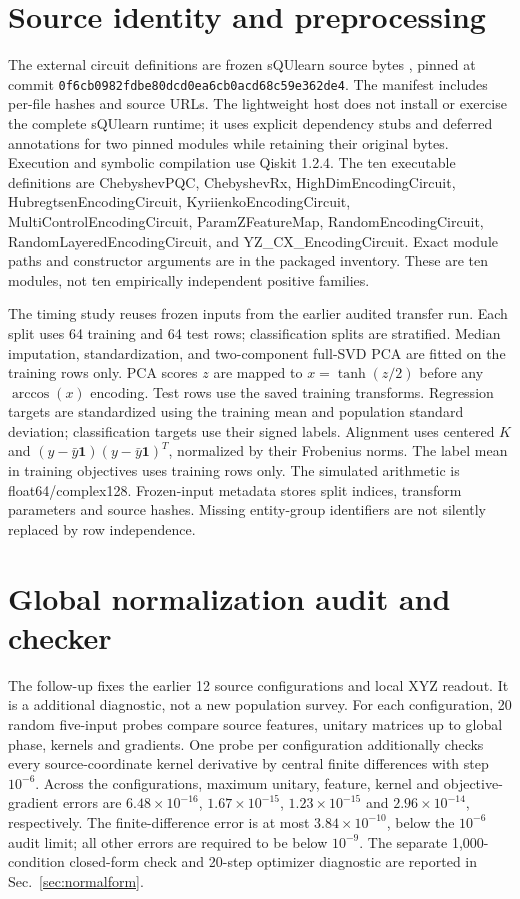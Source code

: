 \section{Source identity and preprocessing}
\label{app:source}
{\raggedright
The external circuit definitions are frozen sQUlearn source bytes
\cite{squlearn}, pinned at commit
\texttt{0f6cb0982fdbe80dcd0ea6cb0acd68c59e362de4}.
The manifest includes per-file hashes and source URLs. The lightweight
host does not install or exercise the complete sQUlearn runtime;
it uses explicit dependency stubs and deferred annotations for two
pinned modules while retaining their original bytes. Execution and
symbolic compilation use Qiskit 1.2.4. The ten executable definitions are
ChebyshevPQC, ChebyshevRx, HighDimEncodingCircuit, HubregtsenEncodingCircuit,
KyriienkoEncodingCircuit, MultiControlEncodingCircuit, ParamZFeatureMap,
RandomEncodingCircuit, RandomLayeredEncodingCircuit, and YZ\_CX\_EncodingCircuit.
Exact module paths and constructor arguments are in the packaged inventory.
These are ten modules, not ten empirically independent positive families.\par}

The timing study reuses frozen inputs from the earlier audited transfer
run. Each split uses 64 training and 64 test rows; classification splits
are stratified. Median imputation, standardization, and two-component
full-SVD PCA are fitted on the training rows only. PCA scores $z$ are
mapped to $x=\tanh(z/2)$ before any $\arccos(x)$ encoding. Test rows
use the saved training transforms. Regression targets are standardized
using the training mean and population standard deviation; classification
targets use their signed labels. Alignment uses centered $K$ and
$(y-\bar y\mathbf1)(y-\bar y\mathbf1)^T$, normalized by their Frobenius
norms. The label mean in training objectives uses training rows only.
The simulated arithmetic is float64/complex128. Frozen-input metadata
stores split indices, transform parameters and source hashes. Missing
entity-group identifiers are not silently replaced by row independence.

\section{Global normalization audit and checker}
\label{app:global}
The follow-up fixes the earlier 12 source configurations and local XYZ
readout. It is a additional diagnostic, not a new population survey.
For each configuration, 20 random five-input probes compare source
features, unitary matrices up to global phase, kernels and gradients.
One probe per configuration additionally checks every source-coordinate
kernel derivative by central finite differences with step $10^{-6}$.
Across the configurations, maximum unitary, feature, kernel and
objective-gradient errors are $6.48\times10^{-16}$,
$1.67\times10^{-15}$, $1.23\times10^{-15}$ and
$2.96\times10^{-14}$, respectively. The finite-difference error is
at most $3.84\times10^{-10}$, below the $10^{-6}$ audit limit;
all other errors are required to be below $10^{-9}$.
The separate 1,000-condition closed-form check and 20-step optimizer
diagnostic are reported in Sec.~\ref{sec:normalform}.

